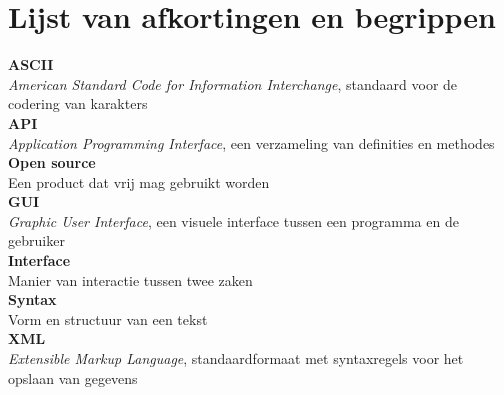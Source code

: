 \chapter*{Lijst van afkortingen en begrippen}
\textbf{ASCII}
\\ 
\textit{American Standard Code for Information Interchange}, standaard voor de codering van karakters
\\
\textbf{API}
\\ 
\textit{Application Programming Interface}, een verzameling van definities en methodes
\\
\textbf{Open source}
\\ 
Een product dat vrij mag gebruikt worden
\\
\textbf{GUI} 
\\ 
\textit{Graphic User Interface}, een visuele interface tussen een programma en de gebruiker
\\
\textbf{Interface} 
\\ 
Manier van interactie tussen twee zaken
\\
\textbf{Syntax}
\\ 	
Vorm en structuur van een tekst
\\
\textbf{XML} 
\\
\textit{Extensible Markup Language}, standaardformaat met syntaxregels voor het opslaan van gegevens